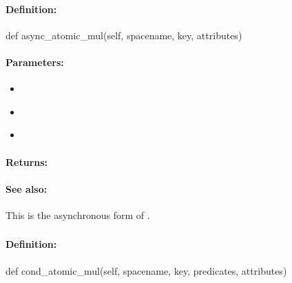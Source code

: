 \paragraph{Definition:}
\begin{pythoncode}
def async_atomic_mul(self, spacename, key, attributes)
\end{pythoncode}

\paragraph{Parameters:}
\begin{itemize}[noitemsep]
\item {}\\

\item {}\\

\item {}\\

\end{itemize}

\paragraph{Returns:}


\paragraph{See also:}  This is the asynchronous form of .

\pagebreak
\subsubsection{}
\label{api:python:cond_atomic_mul}


\paragraph{Definition:}
\begin{pythoncode}
def cond_atomic_mul(self, spacename, key, predicates, attributes)
\end{pythoncode}

